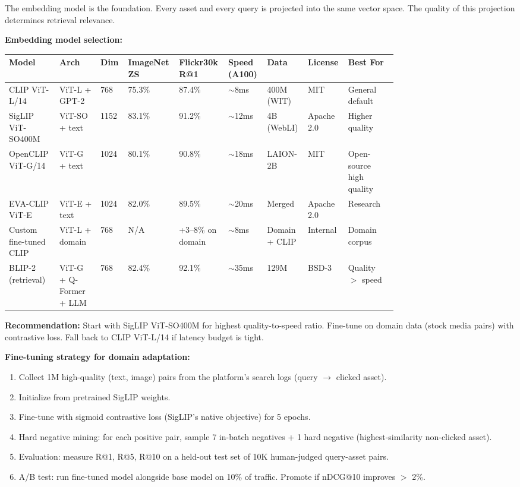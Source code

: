The embedding model is the foundation. Every asset and every query is projected into the same vector space. The quality of this projection determines retrieval relevance.

\textbf{Embedding model selection:}

\begin{tabular}{|p{0.12\linewidth}|p{0.10\linewidth}|p{0.06\linewidth}|p{0.07\linewidth}|p{0.09\linewidth}|p{0.07\linewidth}|p{0.07\linewidth}|p{0.06\linewidth}|p{0.12\linewidth}|}
\hline
\textbf{Model} & \textbf{Arch} & \textbf{Dim} & \textbf{ImageNet ZS} & \textbf{Flickr30k R@1} & \textbf{Speed (A100)} & \textbf{Data} & \textbf{License} & \textbf{Best For} \\
\hline
CLIP ViT-L/14 & ViT-L + GPT-2 & 768 & 75.3\% & 87.4\% & $\sim$8ms & 400M (WIT) & MIT & General default \\
\hline
SigLIP ViT-SO400M & ViT-SO + text & 1152 & 83.1\% & 91.2\% & $\sim$12ms & 4B (WebLI) & Apache 2.0 & Higher quality \\
\hline
OpenCLIP ViT-G/14 & ViT-G + text & 1024 & 80.1\% & 90.8\% & $\sim$18ms & LAION-2B & MIT & Open-source high quality \\
\hline
EVA-CLIP ViT-E & ViT-E + text & 1024 & 82.0\% & 89.5\% & $\sim$20ms & Merged & Apache 2.0 & Research \\
\hline
Custom fine-tuned CLIP & ViT-L + domain & 768 & N/A & +3--8\% on domain & $\sim$8ms & Domain + CLIP & Internal & Domain corpus \\
\hline
BLIP-2 (retrieval) & ViT-G + Q-Former + LLM & 768 & 82.4\% & 92.1\% & $\sim$35ms & 129M & BSD-3 & Quality $>$ speed \\
\hline
\end{tabular}

\textbf{Recommendation:} Start with SigLIP ViT-SO400M for highest quality-to-speed ratio. Fine-tune on domain data (stock media pairs) with contrastive loss. Fall back to CLIP ViT-L/14 if latency budget is tight.

\textbf{Fine-tuning strategy for domain adaptation:}

\begin{enumerate}
  \item Collect 1M high-quality (text, image) pairs from the platform's search logs (query $\rightarrow$ clicked asset).
  \item Initialize from pretrained SigLIP weights.
  \item Fine-tune with sigmoid contrastive loss (SigLIP's native objective) for 5 epochs.
  \item Hard negative mining: for each positive pair, sample 7 in-batch negatives + 1 hard negative (highest-similarity non-clicked asset).
  \item Evaluation: measure R@1, R@5, R@10 on a held-out test set of 10K human-judged query-asset pairs.
  \item A/B test: run fine-tuned model alongside base model on 10\% of traffic. Promote if nDCG@10 improves $>$ 2\%.
\end{enumerate}

